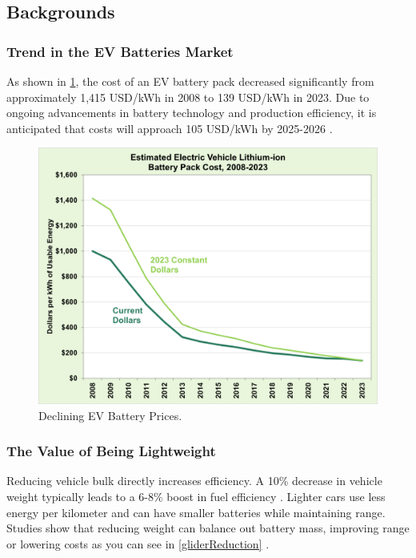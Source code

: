 \documentclass[11pt,twocolumn]{article}
\begin{document}
        \subsection{Backgrounds}
            \subsubsection{Trend in the EV Batteries Market}
                As shown in \cref{batCost}, the cost of an EV battery pack decreased significantly from approximately 1,415 USD/kWh in 2008 to 139 USD/kWh in 2023.
                Due to ongoing advancements in battery technology and production efficiency, it is anticipated that costs will approach 105 USD/kWh by 2025-2026 \cite{doe23}\cite{nrel23}.
                \begin{figure}[h]
                    \centering
                    \includegraphics[width=.8\columnwidth]{batCost.png}
                    \caption{Declining EV Battery Prices.}
                    \label{batCost}
                \end{figure}

            \subsubsection{The Value of Being Lightweight}
                Reducing vehicle bulk directly increases efficiency.
                A 10\% decrease in vehicle weight typically leads to a 6-8\% boost in fuel efficiency \cite{doe23b}.
                Lighter cars use less energy per kilometer and can have smaller batteries while maintaining range.
                Studies show that reducing weight can balance out battery mass, improving range or lowering costs as you can see in \cref{gliderReduction} \cite{doe23b}\cite{nrel23}.
\end{document}
